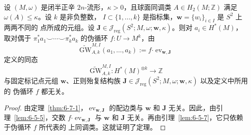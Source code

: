 \begin{theorem}\label{thm:7-3-1}
设 $(M,\omega)$ 是闭半正辛 $2n$-流形，$\kappa>0$，且球面同调类
$A\in H_2(M;\mathbb Z)$ 满足 $\omega(A)\le\kappa$。设 $k$ 是非负整数，
$I\subset\{1,\ldots,k\}$ 是指标集，$\mathbf w=\{w_i\}_{i\in I}$ 是 $S^2$ 上两两不同的
点所成的元组。设
$\mathbf J\in\mathcal J_{\mathrm{reg}}(S^2;M,\omega;\mathbf w,\kappa)$。则对
$a_i\in H^*(M)$，取对偶于
$\pi_1^*a_1\smile\cdots\smile\pi_k^*a_k$ 的伪循环 $f:U\to M^k$，由
\begin{equation}\label{eq:7-3-1}
  \widetilde{\mathrm{GW}}^{M,I}_{A,k}(a_1,\ldots,a_k)
  :=f\mathbin{\boldsymbol\cdot}\operatorname{ev}_{\mathbf w,\mathbf J}
\end{equation}
定义的同态
\[
  \widetilde{\mathrm{GW}}^{M,I}_{A,k}:
  H^*(M)^{\otimes k}\longrightarrow\mathbb Z
\]
与固定标记点元组 $\mathbf w$、正则殆复结构族
$\mathbf J\in\mathcal J_{\mathrm{reg}}(S^2;M,\omega;\mathbf w,\kappa)$ 以及定义中所用的
伪循环 $f$ 都无关。
\end{theorem}

\begin{proof}
由定理~\ref{thm:6-7-1}，$\operatorname{ev}_{\mathbf w,\mathbf J}$ 的配边类与
$\mathbf w$ 和 $\mathbf J$ 无关。因此，由引理~\ref{lem:6-5-5}，交数
$f\mathbin{\boldsymbol\cdot}\operatorname{ev}_{\mathbf w,\mathbf J}$ 与
$\mathbf w$ 和 $\mathbf J$ 无关。再由引理~\ref{lem:6-5-7}，它只依赖于伪循环 $f$ 所代表的
上同调类。这就证明了定理。
\end{proof}

